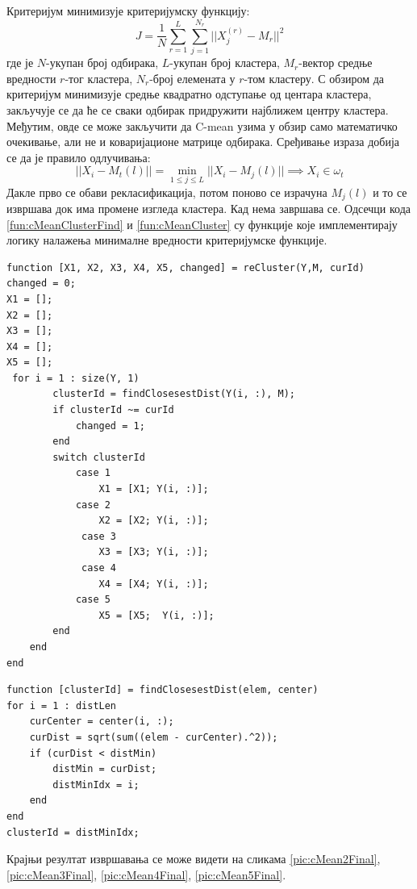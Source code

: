 Критеријум минимизује критеријумску функцију:
$$J=\frac{1}{N}\sum_{r=1}^L\sum_{j=1}^{N_r}||X_j^{(r)} - M_r||^2$$
где је $N$-укупан број одбирака, $L$-укупан број кластера, $M_r$-вектор средње вредности $r$-тог кластера, $N_r$-број елемената у $r$-том кластеру. С обзиром да критеријум минимизује средње квадратно одступање од центара кластера, закључује се да ће се сваки одбирак придружити најближем центру кластера. Међутим, овде се може закључити да C-mean узима у обзир само математичко очекивање, али не и коваријационе матрице одбирака. Сређивање израза добија се да је правило одлучивања:
$$||X_i - M_t(l)|| = \min_{1 \leq j \leq L}||X_i - M_j(l)|| \implies X_i \in \omega_t$$
Дакле прво се обави рекласификација, потом поново се израчуна $M_j(l)$ и то се извршава док има промене изгледа кластера. Кад нема завршава се.  Одсечци кода \ref{fun:cMeanClusterFind} и \ref{fun:cMeanCluster} су функције које имплементирају логику налажења минималне вредности критеријумске функције.

\begin{lstlisting}[caption={Функција налажења кластера за дате одбирке},label={fun:cMeanCluster}]
function [X1, X2, X3, X4, X5, changed] = reCluster(Y,M, curId)
changed = 0;
X1 = [];
X2 = [];
X3 = [];
X4 = [];
X5 = [];
 for i = 1 : size(Y, 1)
        clusterId = findClosesestDist(Y(i, :), M);
        if clusterId ~= curId
            changed = 1;
        end
        switch clusterId
            case 1
                X1 = [X1; Y(i, :)];
            case 2
                X2 = [X2; Y(i, :)];
             case 3
                X3 = [X3; Y(i, :)];
             case 4
                X4 = [X4; Y(i, :)];
            case 5
                X5 = [X5;  Y(i, :)];
        end
    end
end
\end{lstlisting}

\begin{lstlisting}[caption={Функција налажења кластера за дати одбирак},label={fun:cMeanClusterFind}]
function [clusterId] = findClosesestDist(elem, center)
for i = 1 : distLen
    curCenter = center(i, :);
    curDist = sqrt(sum((elem - curCenter).^2));
    if (curDist < distMin)
        distMin = curDist;
        distMinIdx = i;
    end
end
clusterId = distMinIdx;
\end{lstlisting}


Крајњи резултат извршавања се може видети на сликама  \ref{pic:cMean2Final}, \ref{pic:cMean3Final}, \ref{pic:cMean4Final}, \ref{pic:cMean5Final}.	

